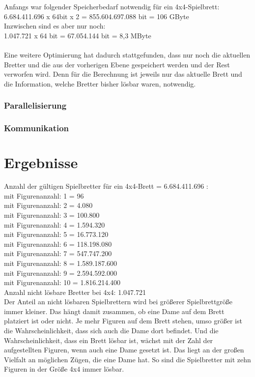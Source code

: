 \documentclass[
	12pt,
	a4paper,
	BCOR10mm,
	DIV14,
	listof=totoc,
	bibliography=totoc,
	headsepline
]{scrreprt}
\begin{document}
Anfangs war folgender Speicherbedarf notwendig für ein 4x4-Spielbrett:\\
6.684.411.696 x 64bit x 2 = 855.604.697.088 bit = 106 GByte \\
Inzwischen sind es aber nur noch: \\
1.047.721 x 64 bit = 67.054.144 bit = 8,3 MByte\\
\\ 
Eine weitere Optimierung hat dadurch stattgefunden, dass nur noch die aktuellen Bretter und die aus der vorherigen Ebene gespeichert werden und der Rest verworfen wird. Denn für die Berechnung ist jeweils nur das aktuelle Brett und die Information, welche Bretter bisher lösbar waren, notwendig.

\subsection{Parallelisierung}
\subsection{Kommunikation}


\chapter{Ergebnisse}
\label{Ergebnisse}

Anzahl der gültigen Spielbretter für ein 4x4-Brett = 6.684.411.696 :\\
mit Figurenanzahl:  1 =         96 \\
mit Figurenanzahl:  2 =       4.080 \\
mit Figurenanzahl:  3 =     100.800 \\
mit Figurenanzahl:  4 =    1.594.320 \\
mit Figurenanzahl:  5 =   16.773.120 \\
mit Figurenanzahl:  6 =  118.198.080 \\
mit Figurenanzahl:  7 =  547.747.200 \\
mit Figurenanzahl:  8 = 1.589.187.600 \\
mit Figurenanzahl:  9 = 2.594.592.000 \\
mit Figurenanzahl: 10 = 1.816.214.400 \\

Anzahl nicht lösbare Bretter bei 4x4: 1.047.721\\

Der Anteil an nicht lösbaren Spielbrettern wird bei größerer Spielbrettgröße immer kleiner. Das hängt damit zusammen, ob eine Dame auf dem Brett platziert ist oder nicht. Je mehr Figuren auf dem Brett stehen, umso größer ist die Wahrscheinlichkeit, dass sich auch die Dame dort befindet. Und die Wahrscheinlichkeit, dass ein Brett lösbar ist, wächst mit der Zahl der aufgestellten Figuren, wenn auch eine Dame gesetzt ist. 
Das liegt an der großen Vielfalt an möglichen Zügen, die eine Dame hat.
So sind die Spielbretter mit zehn Figuren in der Größe 4x4 immer lösbar.
\end{document}
